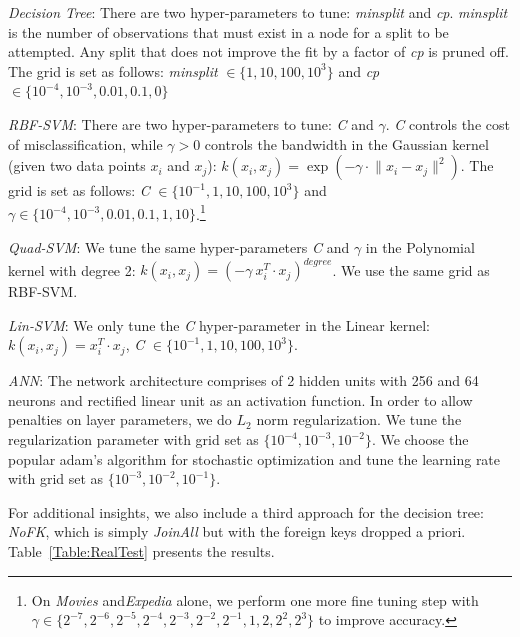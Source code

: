 \documentclass{vldb}
\begin{document}
\vspace{2mm}
\noindent \textit{Decision Tree}: There are two hyper-parameters to tune: \textit{minsplit} and \textit{cp}. \textit{minsplit} is the number of observations that 
must exist in a node for a split to be attempted. Any split that does not improve the fit by a factor of \textit{cp} is pruned off. 
The grid is set as follows: \textit{minsplit} $\in \{ 1, 10, 100, 10^3\}$ and \textit{cp} $\in \{10^{-4}, 10^{-3}, 0.01, 0.1, 0\}$   

\vspace{2mm}
\noindent \textit{RBF-SVM}: There are two hyper-parameters to tune: \textit{C} and $\gamma$. \textit{C} controls the cost of misclassification, while $\gamma > 0$ controls the bandwidth in the Gaussian kernel (given two data points $x_i$ and $x_j$): $k(x_i,x_j) = \exp(-\gamma \cdot \lVert{x_i - x_j} \rVert ^2 )$.
The grid is set as follows: \textit{C} $\in \{10^{-1}, 1, 10, 100, 10^3\}$ and $\gamma \in \{10^{-4}, 10^{-3}, 0.01, 0.1, 1, 10\}$.\footnote{On 
\textit{Movies} and\textit{Expedia} alone, we perform one more fine tuning step with $\gamma \in \{2^{-7}, 2^{-6},2^{-5}, 2^{-4}, 2^{-3}, 2^{-2},2^{-1}, 1,2, 2^{2}, 2^{3}\}$ to improve accuracy.}

\vspace{2mm}
\noindent \textit{Quad-SVM}: We tune the same hyper-parameters \textit{C} and $\gamma$ in the Polynomial kernel with degree 2:
$k(x_i,x_j) = (-\gamma \  x_i ^T \cdot x_j)^{degree}$. We use the same grid as RBF-SVM.
\vspace{2mm}

\noindent \textit{Lin-SVM}: We only tune the \textit{C} hyper-parameter in the Linear kernel: $k(x_i,x_j) = x_i ^T \cdot x_j $, \textit{C} $\in \{10^{-1}, 1, 10, 100, 10^3\}$.

\vspace{2mm}
\noindent \textit{ANN}: The network architecture comprises of 2 hidden units with 256 and 64 neurons and rectified linear unit as an activation function. In order to allow penalties on layer parameters, we do $L_2$ norm regularization. We tune the regularization parameter with grid set as $\{ 10^{-4}, 10^{-3}, 10^{-2} \}$. We choose the popular adam's algorithm for stochastic optimization and tune the learning rate with grid set as $\{ 10^{-3}, 10^{-2}, 10^{-1} \}$. 

For additional insights, we also include a third approach for the decision tree: \textit{NoFK}, which is simply \textit{JoinAll} but with the foreign keys dropped a priori.
Table~\ref{Table:RealTest} presents the results.
\end{document}
